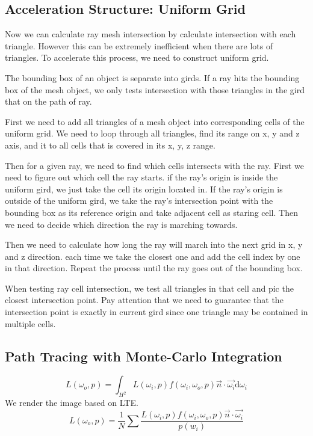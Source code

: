 \documentclass[acmtog]{acmart}
\begin{document}
\subsection{Acceleration Structure: Uniform Grid}
Now we can calculate ray mesh intersection by calculate intersection with each triangle. However this can be extremely inefficient when there are lots of triangles. To accelerate this process, we need to construct uniform grid.

The bounding box of an object is separate into girds. If a ray hits the bounding box of the mesh object, we only tests intersection with those triangles in the gird that on the path of ray.

First we need to add all triangles of a mesh object into corresponding cells of the uniform grid. We need to loop through all triangles, find its range on x, y and z axis, and it to all cells that is covered in its x, y, z range.

Then for a given ray, we need to find which cells intersects with the ray. First we need to figure out which cell the ray starts. if the ray's origin is inside the uniform gird, we just take the cell its origin located in. If the ray's origin is outside of the uniform gird, we take the ray's intersection point with the bounding box as its reference origin and take adjacent cell as staring cell. Then we need to decide which direction the ray is marching towards.

Then we need to calculate how long the ray will march into the next grid in x, y and z direction. each time we take the closest one and add the cell index by one in that direction. Repeat the process until the ray goes out of the bounding box.

When testing ray cell intersection, we test all triangles in that cell and pic the closest intersection point. Pay attention that we need to guarantee that the intersection point is exactly in current gird since one triangle may be contained in multiple cells.

\subsection{Path Tracing with Monte-Carlo Integration}
\[L(\omega_o, p) = \int_{H^2} L(\omega_i, p) f(\omega_i, \omega_o, p) \vec{n}\cdot \vec{\omega_i} \mathrm{d}\omega_i\]
We render the image based on LTE.
\[L(\omega_o, p) = \frac{1}{N} \sum \frac{L(\omega_i, p) f(\omega_i, \omega_o, p) \vec{n}\cdot \vec{\omega_i}}{p(w_i)}\]
\end{document}
